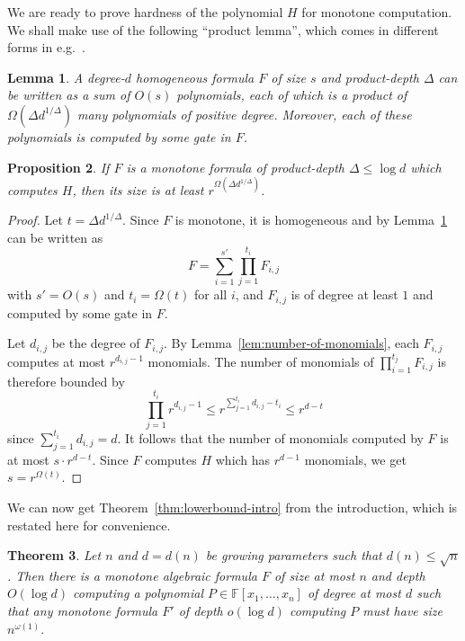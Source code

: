 \documentclass[11pt,a4paper]{article}
\newtheorem{theorem}{Theorem}
\newtheorem{lemma}[theorem]{Lemma}
\newtheorem{proposition}[theorem]{Proposition}
\newcommand{\F}{\mathbb{F}}
\begin{document}
We are ready to prove hardness of the polynomial $H$ for monotone computation.
We shall make use of the following ``product lemma'', which comes in different forms in e.g.~\cite{SY, HrubesY11,Ramprasadsurvey}.

\begin{lemma}\label{lem:product-decomposition}
	A degree-$d$ homogeneous formula $F$ of size $s$ and product-depth $\Delta$
	can be written as a sum of $O(s)$ polynomials, %
	each of which
	is a product of $\Omega(\Delta d^{1/\Delta})$ many polynomials of
	positive degree. Moreover, each of these polynomials is computed by
	some gate in $F$.
\end{lemma}

\begin{proposition}
	\label{prop:hardness-of-H}
	If \(F\) is a monotone formula of product-depth \(\Delta  \leq \log d\)
	which computes \(H\), then its size is at least $r^{\Omega(\Delta d^{1/\Delta})}$.
\end{proposition}

\begin{proof}
	Let $t=\Delta d^{1/\Delta}$.
	Since $F$ is monotone, it is homogeneous and by Lemma~\ref{lem:product-decomposition} can be written as
	$$F = \sum_{i=1}^{s'} \prod_{j=1}^{t_i} F_{i,j}$$
	with $s'=O(s)$ and $t_i =\Omega(t)$ for all $i$, 
	and $F_{i,j}$ is of degree at least $1$ and computed by some gate in $F$.
	
	Let $d_{i,j}$ be the degree of $F_{i,j}$.
	By Lemma~\ref{lem:number-of-monomials}, each $F_{i,j}$ computes at most $r^{d_{i,j}-1}$ monomials.
	The number of monomials of $\prod_{i=1}^{t_j} F_{i,j}$ is therefore bounded by
	$$\prod_{j=1}^{t_i} r^{d_{i,j}-1} \leq r^{\sum_{j=1}^{t_i} d_{i,j}-t_i} \leq r^{d-t}$$
	since $\sum_{j=1}^{t_i} d_{i,j} = d$.
	It follows that the number of monomials computed by $F$ is at most $s \cdot r^{d-t}$.
	Since $F$ computes $H$ which has $r^{d-1}$ monomials, we get $s = r^{\Omega (t)}$.
\end{proof}

We can now get Theorem~\ref{thm:lowerbound-intro} from the introduction, which is restated here for convenience.
\begin{theorem}
	\label{thm:lowerbound}
	Let $n$ and $d = d(n)$ be growing parameters such that $d(n)\leq \sqrt{n}$. Then there is a monotone algebraic formula $F$ of size at most $n$ and depth $O(\log d)$ computing a polynomial $P\in \F[x_1,\ldots,x_n]$ of degree at most $d$ such that any monotone formula $F'$ of depth $o(\log d)$ computing $P$ must have size $n^{\omega(1)}.$
\end{theorem}
\end{document}
